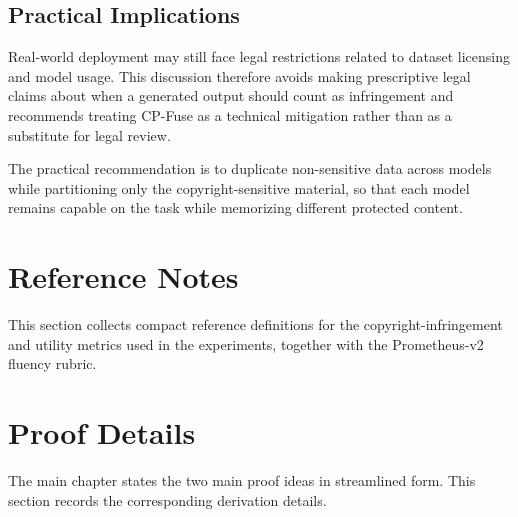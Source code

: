 \subsection{Practical Implications}

Real-world deployment may still face legal restrictions related to dataset licensing and model usage. This discussion therefore avoids making prescriptive legal claims about when a generated output should count as infringement and recommends treating CP-Fuse as a technical mitigation rather than as a substitute for legal review.

The practical recommendation is to duplicate non-sensitive data across models while partitioning only the copyright-sensitive material, so that each model remains capable on the task while memorizing different protected content.

\FloatBarrier
\clearpage

\section{Reference Notes}
\label{app:cpfuse-reference}

This section collects compact reference definitions for the copyright-infringement and utility metrics used in the experiments, together with the Prometheus-v2 fluency rubric.



\FloatBarrier
\clearpage

\section{Proof Details}
\label{app:cpfuse-proofs}

The main chapter states the two main proof ideas in streamlined form. This section records the corresponding derivation details.


